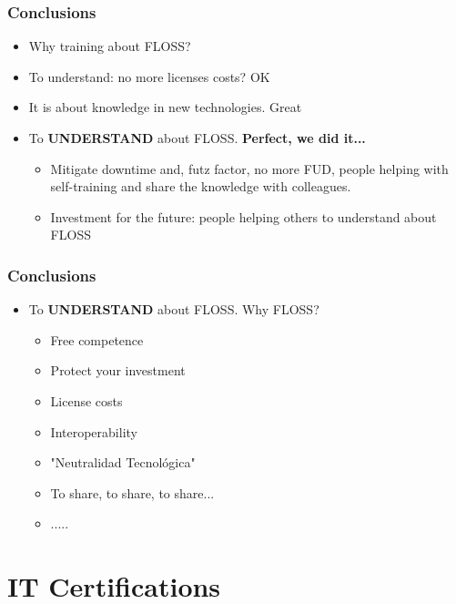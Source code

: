 \documentclass{beamer}
\begin{document}
\begin{frame}
\frametitle{Conclusions}
\begin{itemize}
\item Why training about FLOSS?
\item To understand: no more licenses costs? OK
\item It is about knowledge in new technologies. Great
\item To \textbf{UNDERSTAND} about FLOSS. \textbf{Perfect, we did it...}
\begin{itemize}
	\item Mitigate downtime and, futz factor, no more FUD, people helping with self-training and share the knowledge with colleagues. 
	\item Investment for the future: people helping others to understand about FLOSS
\end{itemize}
\end{itemize}
\end{frame}


\begin{frame}
\frametitle{Conclusions}
\begin{itemize}
\item To \textbf{UNDERSTAND} about FLOSS. Why FLOSS?
\begin{itemize}
	\item Free competence
	\item Protect your investment
	\item License costs
	\item Interoperability
	\item "Neutralidad Tecnológica"
	\item To share, to share, to share...
	\item .....
\end{itemize}
\end{itemize}
\end{frame}


\section{IT Certifications}

\end{document}
